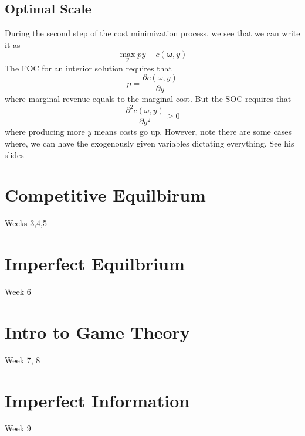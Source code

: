 \documentclass[12pt]{article}
\begin{document}
\subsection{Optimal Scale}
During the second step of the cost minimization process, we see that we can write it as 
\[
\max_y py - c(\mathbf{\omega}, y)
\]
The FOC for an interior solution requires that 
\[
p = \frac{\partial c(\omega, y)}{\partial y}
\]
where marginal revenue equals to the marginal cost. But the SOC requires that 
\[
\frac{\partial^2 c(\omega, y)}{\partial y^2} \geq 0 
\]
where producing more $y$ means costs go up. However, note there are some cases where, we can have the exogenously given variables dictating everything. See his slides 
\section{Competitive Equilbirum}
Weeks 3,4,5
\section{Imperfect Equilbrium}
Week 6
\section{Intro to Game Theory}
Week 7, 8
\section{Imperfect Information}
Week 9
\end{document}
